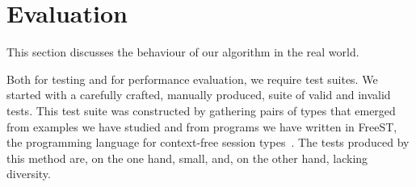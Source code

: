 \section{Evaluation}
\label{sec:evaluation}

This section discusses the behaviour of our algorithm in the real
world.

Both for testing and for performance evaluation, we require test
suites. We started with a carefully crafted, manually produced, suite
of valid and invalid tests. This test suite was constructed by
gathering pairs of types that emerged from examples we have studied
and from programs we have written in FreeST, the programming language
for context-free session
types~\cite{almeida.etal_freest-functional-language}.
The tests produced by this method are, on the one hand, small, and, on
the other hand, lacking diversity.

